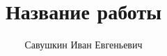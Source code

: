\newcommand{\resdir}{res}							%

\newcommand{\docauthor}{Савушкин Иван Евгеньевич}
\newcommand{\docauthorshort}{Савушкин\,И.\,Е.}
\newcommand{\docauthordept}{Группа P3311\\Кафедра Вычислительной Техники}
\newcommand{\docauthormail}{savushkin@niuitmo.ru}
\newcommand{\doctitle}{Название работы}
\newcommand{\docsupervisor}{Иванов\,И.\,И.}
\newcommand{\coursename}{Название предмета}
\newcommand{\worktype}{Тип работы}

\title{\doctitle}
\author{\docauthor}









